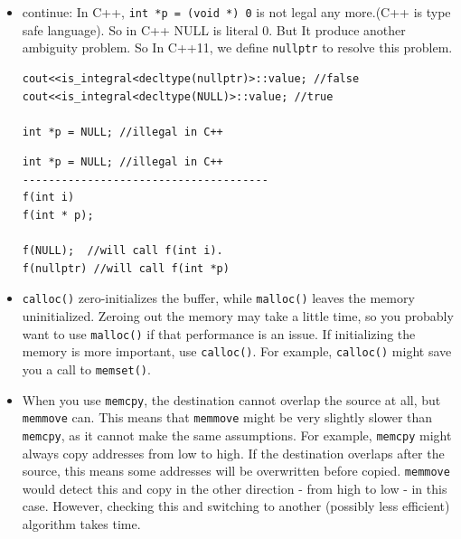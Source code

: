 \documentclass[a4paper,11pt,twoside]{book}
\begin{document}
\begin{itemize}
	\item continue: In C++, \texttt{int *p = (void *) 0} is not legal any more.(C++ is type safe language).  So in C++ NULL is literal 0. But It produce another ambiguity problem.  So In C++11, we define \texttt{nullptr} to resolve this problem.
\begin{lstlisting}[numbers=none]
cout<<is_integral<decltype(nullptr)>::value; //false
cout<<is_integral<decltype(NULL)>::value; //true

int *p = NULL; //illegal in C++
\end{lstlisting}

	
\begin{lstlisting}[numbers=none]
int *p = NULL; //illegal in C++
--------------------------------------
f(int i)
f(int * p);

f(NULL);  //will call f(int i).
f(nullptr) //will call f(int *p)
\end{lstlisting}
	
	\item \texttt{calloc()} zero-initializes the buffer, while \texttt{malloc()} leaves the memory uninitialized. Zeroing out the memory may take a little time, so you probably want to use \texttt{malloc()} if that performance is an issue. If initializing the memory is more important, use \texttt{calloc()}. For example, \texttt{calloc()} might save you a call to \texttt{memset()}.
	
	\item When you use \texttt{memcpy}, the destination cannot overlap the source at all, but \texttt{memmove} can. This means that \texttt{memmove} might be very slightly slower than \texttt{memcpy}, as it cannot make the same assumptions. For example, \texttt{memcpy} might always copy addresses from low to high. If the destination overlaps after the source, this means some addresses will be overwritten before copied. \texttt{memmove} would detect this and copy in the other direction - from high to low - in this case. However, checking this and switching to another (possibly less efficient) algorithm takes time.
\end{itemize}
\end{document}
